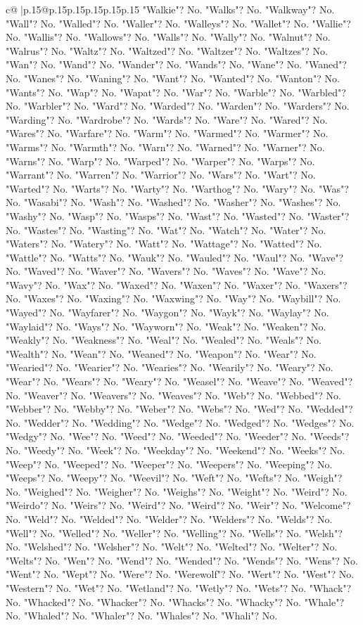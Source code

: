 \documentclass{article}
\begin{document}
{\begin{supertabular}{c@{$\;$}|p{.15\linewidth}@{}p{.15\linewidth}p{.15\linewidth}p{.15\linewidth}p{.15\linewidth}p{.15\linewidth}}
{{{"Walkie"? No. "Walks"? No. "Walkway"? No. "Wall"? No. "Walled"? No. "Waller"? No. "Walleys"? No. "Wallet"? No. "Wallie"? No. "Wallis"? No. "Wallows"? No. "Walls"? No. "Wally"? No. "Walnut"? No. "Walrus"? No. "Waltz"? No. "Waltzed"? No. "Waltzer"? No. "Waltzes"? No. "Wan"? No. "Wand"? No. "Wander"? No. "Wands"? No. "Wane"? No. "Waned"? No. "Wanes"? No. "Waning"? No. "Want"? No. "Wanted"? No. "Wanton"? No. "Wants"? No. "Wap"? No. "Wapat"? No. "War"? No. "Warble"? No. "Warbled"? No. "Warbler"? No. "Ward"? No. "Warded"? No. "Warden"? No. "Warders"? No. "Warding"? No. "Wardrobe"? No. "Wards"? No. "Ware"? No. "Wared"? No. "Wares"? No. "Warfare"? No. "Warm"? No. "Warmed"? No. "Warmer"? No. "Warms"? No. "Warmth"? No. "Warn"? No. "Warned"? No. "Warner"? No. "Warns"? No. "Warp"? No. "Warped"? No. "Warper"? No. "Warps"? No. "Warrant"? No. "Warren"? No. "Warrior"? No. "Wars"? No. "Wart"? No. "Warted"? No. "Warts"? No. "Warty"? No. "Warthog"? No. "Wary"? No. "Was"? No. "Wasabi"? No. "Wash"? No. "Washed"? No. "Washer"? No. "Washes"? No. "Washy"? No. "Wasp"? No. "Wasps"? No. "Wast"? No. "Wasted"? No. "Waster"? No. "Wastes"? No. "Wasting"? No. "Wat"? No. "Watch"? No. "Water"? No. "Waters"? No. "Watery"? No. "Watt"? No. "Wattage"? No. "Watted"? No. "Wattle"? No. "Watts"? No. "Wauk"? No. "Wauled"? No. "Waul"? No. "Wave"? No. "Waved"? No. "Waver"? No. "Wavers"? No. "Waves"? No. "Wave"? No. "Wavy"? No. "Wax"? No. "Waxed"? No. "Waxen"? No. "Waxer"? No. "Waxers"? No. "Waxes"? No. "Waxing"? No. "Waxwing"? No. "Way"? No. "Waybill"? No. "Wayed"? No. "Wayfarer"? No. "Waygon"? No. "Wayk"? No. "Waylay"? No. "Waylaid"? No. "Ways"? No. "Wayworn"? No. "Weak"? No. "Weaken"? No. "Weakly"? No. "Weakness"? No. "Weal"? No. "Wealed"? No. "Weals"? No. "Wealth"? No. "Wean"? No. "Weaned"? No. "Weapon"? No. "Wear"? No. "Wearied"? No. "Wearier"? No. "Wearies"? No. "Wearily"? No. "Weary"? No. "Wear"? No. "Wears"? No. "Weary"? No. "Weasel"? No. "Weave"? No. "Weaved"? No. "Weaver"? No. "Weavers"? No. "Weaves"? No. "Web"? No. "Webbed"? No. "Webber"? No. "Webby"? No. "Weber"? No. "Webs"? No. "Wed"? No. "Wedded"? No. "Wedder"? No. "Wedding"? No. "Wedge"? No. "Wedged"? No. "Wedges"? No. "Wedgy"? No. "Wee"? No. "Weed"? No. "Weeded"? No. "Weeder"? No. "Weeds"? No. "Weedy"? No. "Week"? No. "Weekday"? No. "Weekend"? No. "Weeks"? No. "Weep"? No. "Weeped"? No. "Weeper"? No. "Weepers"? No. "Weeping"? No. "Weeps"? No. "Weepy"? No. "Weevil"? No. "Weft"? No. "Wefts"? No. "Weigh"? No. "Weighed"? No. "Weigher"? No. "Weighs"? No. "Weight"? No. "Weird"? No. "Weirdo"? No. "Weirs"? No. "Weird"? No. "Weird"? No. "Weir"? No. "Welcome"? No. "Weld"? No. "Welded"? No. "Welder"? No. "Welders"? No. "Welds"? No. "Well"? No. "Welled"? No. "Weller"? No. "Welling"? No. "Wells"? No. "Welsh"? No. "Welshed"? No. "Welsher"? No. "Welt"? No. "Welted"? No. "Welter"? No. "Welts"? No. "Wen"? No. "Wend"? No. "Wended"? No. "Wends"? No. "Wens"? No. "Went"? No. "Wept"? No. "Were"? No. "Werewolf"? No. "Wert"? No. "West"? No. "Western"? No. "Wet"? No. "Wetland"? No. "Wetly"? No. "Wets"? No. "Whack"? No. "Whacked"? No. "Whacker"? No. "Whacks"? No. "Whacky"? No. "Whale"? No. "Whaled"? No. "Whaler"? No. "Whales"? No. "Whali"? No. }}}
\end{supertabular}}
\end{document}

